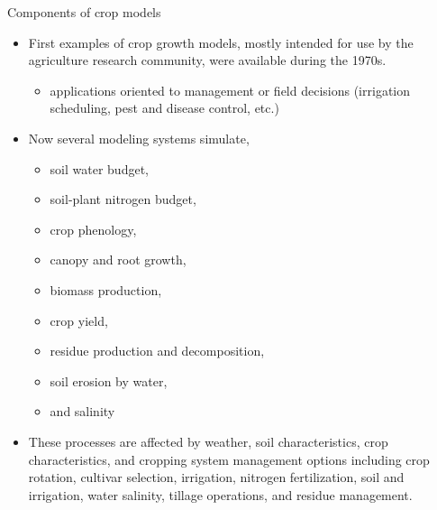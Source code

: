 \documentclass[11pt,dvipsnames,ignorenonframetext,aspectratio=169]{beamer}
\providecommand{\tightlist}{%
  \setlength{\itemsep}{0pt}\setlength{\parskip}{0pt}}
\begin{document}
\begin{frame}{Components of crop models}
\protect\hypertarget{components-of-crop-models}{}
\begin{itemize}
\tightlist
\item
  First examples of crop growth models, mostly intended for use by the
  agriculture research community, were available during the 1970s.

  \begin{itemize}
  \tightlist
  \item
    applications oriented to management or field decisions (irrigation
    scheduling, pest and disease control, etc.)
  \end{itemize}
\item
  Now several modeling systems simulate,

  \begin{multicols}{3}
  \begin{itemize}
  \footnotesize
  \item soil water budget,
  \item soil-plant nitrogen budget,
  \item crop phenology,
  \item canopy and root growth,
  \item biomass production,
  \item crop yield,
  \item residue production and decomposition,
  \item soil erosion by water,
  \item and salinity
  \end{itemize}
  \end{multicols}
\item
  These processes are affected by weather, soil characteristics, crop
  characteristics, and cropping system management options including crop
  rotation, cultivar selection, irrigation, nitrogen fertilization, soil
  and irrigation, water salinity, tillage operations, and residue
  management.
\end{itemize}
\end{frame}
\end{document}

